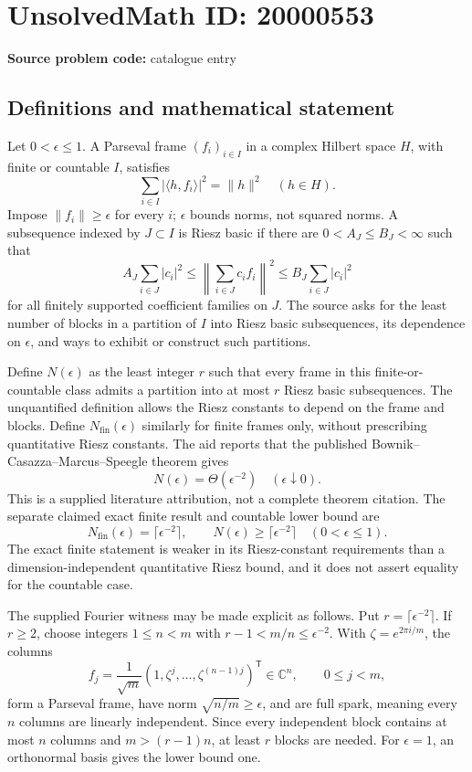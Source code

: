 \documentclass[11pt]{article}
\newcommand{\C}{\mathbb{C}}
\begin{document}
\section*{UnsolvedMath ID: 20000553}
\textbf{Source problem code:} catalogue entry
\subsection{Definitions and mathematical statement}
Let \(0<\epsilon\leq1\). A Parseval frame \((f_i)_{i\in I}\) in a complex Hilbert space \(H\), with finite or countable \(I\), satisfies
\[
 \sum_{i\in I}|\langle h,f_i\rangle|^2=\|h\|^2\quad(h\in H).
\]
Impose \(\|f_i\|\geq\epsilon\) for every \(i\); \(\epsilon\) bounds norms, not squared norms. A subsequence indexed by \(J\subset I\) is Riesz basic if there are \(0<A_J\leq B_J<\infty\) such that
\[
 A_J\sum_{i\in J}|c_i|^2\leq\left\|\sum_{i\in J}c_if_i\right\|^2
 \leq B_J\sum_{i\in J}|c_i|^2
\]
for all finitely supported coefficient families on \(J\). The source asks for the least number of blocks in a partition of \(I\) into Riesz basic subsequences, its dependence on \(\epsilon\), and ways to exhibit or construct such partitions.

Define \(N(\epsilon)\) as the least integer \(r\) such that every frame in this finite-or-countable class admits a partition into at most \(r\) Riesz basic subsequences. The unquantified definition allows the Riesz constants to depend on the frame and blocks. Define \(N_{\mathrm{fin}}(\epsilon)\) similarly for finite frames only, without prescribing quantitative Riesz constants. The aid reports that the published Bownik--Casazza--Marcus--Speegle theorem gives
\[
 N(\epsilon)=\Theta(\epsilon^{-2})\quad(\epsilon\downarrow0).
\]
This is a supplied literature attribution, not a complete theorem citation. The separate claimed exact finite result and countable lower bound are
\[
 N_{\mathrm{fin}}(\epsilon)=\lceil\epsilon^{-2}\rceil,
 \qquad N(\epsilon)\geq\lceil\epsilon^{-2}\rceil
 \quad(0<\epsilon\leq1).
\]
The exact finite statement is weaker in its Riesz-constant requirements than a dimension-independent quantitative Riesz bound, and it does not assert equality for the countable case.

The supplied Fourier witness may be made explicit as follows. Put \(r=\lceil\epsilon^{-2}\rceil\). If \(r\geq2\), choose integers \(1\leq n<m\) with \(r-1<m/n\leq\epsilon^{-2}\). With \(\zeta=e^{2\pi i/m}\), the columns
\[
 f_j=\frac1{\sqrt m}(1,\zeta^j,\ldots,\zeta^{(n-1)j})^{\mathsf T}\in\C^n,
 \qquad0\leq j<m,
\]
form a Parseval frame, have norm \(\sqrt{n/m}\geq\epsilon\), and are full spark, meaning every \(n\) columns are linearly independent. Since every independent block contains at most \(n\) columns and \(m>(r-1)n\), at least \(r\) blocks are needed. For \(\epsilon=1\), an orthonormal basis gives the lower bound one.
\end{document}
